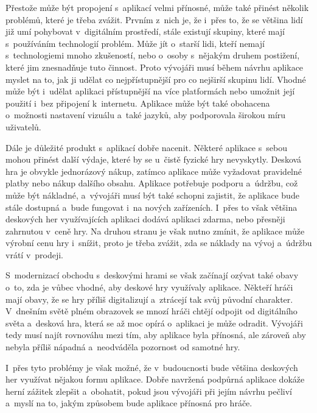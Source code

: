 Přestože může být propojení s~aplikací velmi přínosné, může také přinést několik problémů, které je třeba zvážit. Prvním z~nich je, že i~přes to, že se většina lidí již umí pohybovat v~digitálním prostředí, stále existují skupiny, které mají s~používáním technologií problém. Může jít o~starší lidi, kteří nemají s~technologiemi mnoho zkušeností, nebo o~osoby s~nějakým druhem postižení, které jim znesnadňuje tuto činnost. Proto vývojáři musí během návrhu aplikace myslet na to, jak ji udělat co nejpřístupnější pro co nejširší skupinu lidí. Vhodné může být i~udělat aplikaci přístupnější na více platformách nebo umožnit její použití i~bez připojení k~internetu. Aplikace může být také obohacena o~možnosti nastavení vizuálu a~také jazyků, aby podporovala širokou míru uživatelů.

Dále je důležité produkt s~aplikací dobře nacenit. Některé aplikace s~sebou mohou přinést další výdaje, které by se u~čistě fyzické hry nevyskytly. Desková hra je obvykle jednorázový nákup, zatímco aplikace může vyžadovat pravidelné platby nebo nákup dalšího obsahu. Aplikace potřebuje podporu a~údržbu, což může být nákladné, a~vývojáři musí být také schopni zajistit, že aplikace bude stále dostupná a~bude fungovat i~na nových zařízeních. I~přes to však většina deskových her využívajících aplikaci dodává aplikaci zdarma, nebo přesněji zahrnutou v~ceně hry. Na druhou stranu je však nutno zmínit, že aplikace může výrobní cenu hry i~snížit, proto je třeba zvážit, zda se náklady na vývoj a~údržbu vrátí v~prodeji.

S~modernizací obchodu s~deskovými hrami se však začínají ozývat také obavy o~to, zda je vůbec vhodné, aby deskové hry využívaly aplikace. Někteří hráči mají obavy, že se hry příliš digitalizují a~ztrácejí tak svůj původní charakter. V~dnešním světě plném obrazovek se mnozí hráči chtějí odpojit od digitálního světa a~desková hra, která se až moc opírá o~aplikaci je může odradit. Vývojáři tedy musí najít rovnováhu mezi tím, aby aplikace byla přínosná, ale zároveň aby nebyla příliš nápadná a~neodváděla pozornost od samotné hry.

I~přes tyto problémy je však možné, že v~budoucnosti bude většina deskových her využívat nějakou formu aplikace. Dobře navržená podpůrná aplikace dokáže herní zážitek zlepšit a~obohatit, pokud jsou vývojáři při jejím návrhu pečliví a~myslí na to, jakým způsobem bude aplikace přínosná pro hráče.




